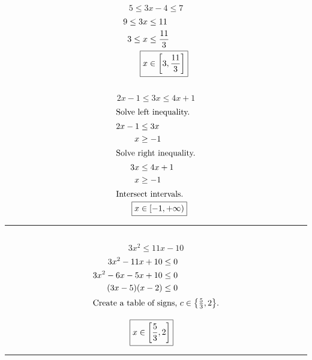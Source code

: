 	\subsection{}
		\[5 \leq 3x - 4 \leq 7\]
		\begin{align*}
			9 \leq 3x &\leq 11 \\
			3 \leq x &\leq \frac{11}{3} \\
			\Aboxed{x &\in \left[3, \frac{11}{3}\right]}
		\end{align*}

	\subsection{}
		\[2x - 1 \leq 3x \leq 4x + 1\]
		\begin{align*}
			\intertext{Solve left inequality.}
			2x - 1 &\leq 3x \\
			x &\geq -1 \\
			\intertext{Solve right inequality.}
			3x &\leq 4x + 1 \\
			x &\geq -1 \\
			\intertext{Intersect intervals.}
			\Aboxed{x &\in [-1, +\infty)}
		\end{align*}
		\hrule{}

	\subsection{}
		\[3x^2 \leq 11x - 10\]
		\begin{align*}
			3x^2 - 11x + 10 &\leq 0 \\
			3x^2 - 6x - 5x + 10 &\leq 0 \\
			(3x - 5)(x - 2) &\leq 0 \\
			\intertext{Create a table of signs, $c \in \left\{\frac{5}{3}, 2\right\}$.}
		\end{align*}
		\begin{center}\end{center}
		\begin{align*}
			\Aboxed{x &\in \left[\frac{5}{3}, 2\right]}
		\end{align*}
		\hrule{}

